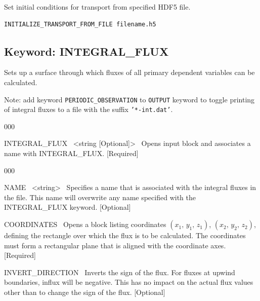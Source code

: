  Set initial conditions for transport from specified HDF5 file.

\begin{mdframed}
\footnotesize
\begin{verbatim}
INITIALIZE_TRANSPORT_FROM_FILE filename.h5 
\end{verbatim}
\normalsize
\end{mdframed}

\hyperlink{target_key}{\return}


\newpage

\protect\hypertarget{target_int_flux}{}

\subsection{Keyword: INTEGRAL\_FLUX}

\hfill\hyperlink{target_key}{\return}

 Sets up a surface through which fluxes of all primary dependent variables can be calculated.

Note: add keyword {\tt PERIODIC\_OBSERVATION} to {\tt OUTPUT} keyword to toggle printing of integral fluxes to a file with the suffix {\tt '*-int.dat'}.

\begin{deflist}{000}

\item[INTEGRAL\_FLUX] \ <string [Optional]> \ 
Opens input block and associates a name with INTEGRAL\_FLUX. [Required]

\begin{deflist}{000}

\item[NAME] \  <string> \
Specifies a name that is associated with the integral fluxes in the  file. This name will overwrite any name specified with the INTEGRAL\_FLUX keyword. [Optional]

\item[COORDINATES] \ 
Opens a block listing coordinates $(x_1,\, y_1,\, z_1)$, $(x_2,\, y_2,\, z_2)$, defining the rectangle over which the flux is to be calculated. The coordinates must form a rectangular plane that is aligned with the coordinate axes. [Required]

\item[INVERT\_DIRECTION] \ 
Inverts the sign of the flux. For fluxes at upwind boundaries, influx will be negative. This has no impact on the actual flux values other than to change the sign of the flux. [Optional]
\end{deflist}

\item[\keyend] ~
\end{deflist}


